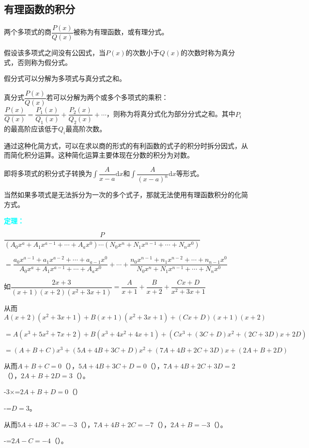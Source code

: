 \documentclass[UTF8, 12pt]{ctexart}
\begin{document}
\subsection{有理函数的积分}

两个多项式的商$\dfrac{P(x)}{Q(x)}$被称为有理函数，或有理分式。

假设该多项式之间没有公因式，当$P(x)$的次数小于$Q(x)$的次数时称为真分式，否则称为假分式。

假分式可以分解为多项式与真分式之和。

真分式$\dfrac{P(x)}{Q(x)}$若可以分解为两个或多个多项式的乘积：$\dfrac{P(x)}{Q(x)}=\dfrac{P_1(x)}{Q_1(x)}+\dfrac{P_2(x)}{Q_2(x)}+\cdots$，则称为将真分式化为部分分式之和。其中$P_i$的最高阶应该低于$Q_i$最高阶次数。

通过这种化简方式，可以在求以商的形式的有利函数的式子的积分时拆分因式，从而简化积分运算。这种简化运算主要体现在分数的积分为对数。

即将多项式的积分式子转换为$\displaystyle{\int\dfrac{A}{x-a}\textrm{d}x}$和$\displaystyle{\int\dfrac{A}{(x-a)^n}\textrm{d}x}$等形式。

当然如果多项式是无法拆分为一次的多个式子，那就无法使用有理函数积分的化简方式。

\textcolor{aqua}{\textbf{定理：}}

$\dfrac{P}{(A_0x^a+A_1x^{a-1}+\cdots+A_ax^0)\cdots(N_0x^n+N_1x^{n-1}+\cdots+N_nx^0)}$ \medskip

$=\dfrac{a_0x^{a-1}+a_1x^{a-2}+\cdots+a_{a-1}x^0}{A_0x^a+A_1x^{a-1}+\cdots+A_ax^0}+\cdots+\dfrac{n_0x^{n-1}+n_1x^{n-2}+\cdots+n_{n-1}x^0}{N_0x^n+N_1x^{n-1}+\cdots+N_nx^0}$ \medskip

如$\dfrac{2x+3}{(x+1)(x+2)(x^2+3x+1)}=\dfrac{A}{x+1}+\dfrac{B}{x+2}+\dfrac{Cx+D}{x^2+3x+1}$ \medskip

从而$A(x+2)(x^2+3x+1)+B(x+1)(x^2+3x+1)+(Cx+D)(x+1)(x+2)$

$=A(x^3+5x^2+7x+2)+B(x^3+4x^2+4x+1)+(Cx^3+(3C+D)x^2+(2C+3D)x+2D)$

$=(A+B+C)x^3+(5A+4B+3C+D)x^2+(7A+4B+2C+3D)x+(2A+B+2D)$

从而$A+B+C=0$（），$5A+4B+3C+D=0$（），$7A+4B+2C+3D=2$（），$2A+B+2D=3$（）。

-3×=$2A+B+D=0$（）

-=$D=3$。

从而$5A+4B+3C=-3$（），$7A+4B+2C=-7$（），$2A+B=-3$（）。

-=$2A-C=-4$（）。
\end{document}
